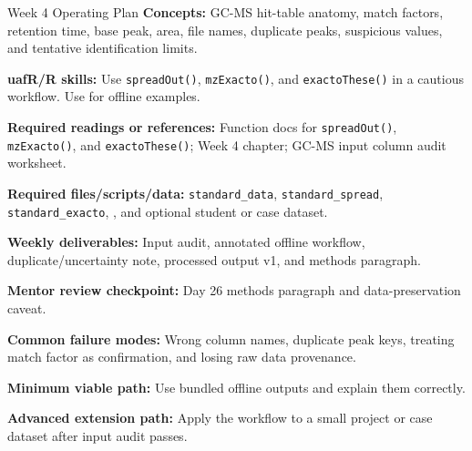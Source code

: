 \begin{checklistbox}{Week 4 Operating Plan}
\textbf{Concepts:} GC-MS hit-table anatomy, match factors, retention time, base peak, area, file names, duplicate peaks, suspicious values, and tentative identification limits.

\textbf{uafR/R skills:} Use \texttt{spreadOut()}, \texttt{mzExacto()}, and \texttt{exactoThese()} in a cautious workflow. Use  for offline examples.

\textbf{Required readings or references:} Function docs for \texttt{spreadOut()}, \texttt{mzExacto()}, and \texttt{exactoThese()}; Week 4 chapter; GC-MS input column audit worksheet.

\textbf{Required files/scripts/data:} \texttt{standard\_data}, \texttt{standard\_spread}, \texttt{standard\_exacto}, , and optional student or case dataset.

\textbf{Weekly deliverables:} Input audit, annotated offline workflow, duplicate/uncertainty note, processed output v1, and methods paragraph.

\textbf{Mentor review checkpoint:} Day 26 methods paragraph and data-preservation caveat.

\textbf{Common failure modes:} Wrong column names, duplicate peak keys, treating match factor as confirmation, and losing raw data provenance.

\textbf{Minimum viable path:} Use bundled offline outputs and explain them correctly.

\textbf{Advanced extension path:} Apply the workflow to a small project or case dataset after input audit passes.
\end{checklistbox}


